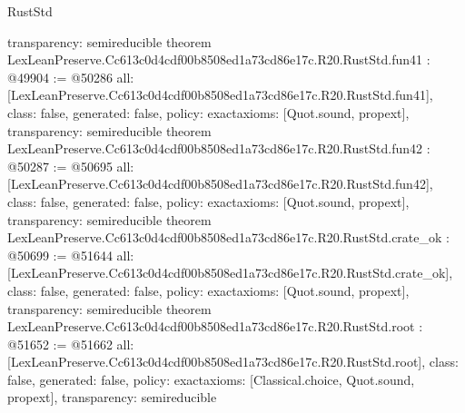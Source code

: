 \begin{lexlean}{RustStd}
\begin{coremodule}
{  transparency: semireducible
}
theorem LexLeanPreserve.Cc613c0d4cdf00b8508ed1a73cd86e17c.R20.RustStd.fun41 : @49904 := @50286 {
  all: [LexLeanPreserve.Cc613c0d4cdf00b8508ed1a73cd86e17c.R20.RustStd.fun41],
  class: false,
  generated: false,
  policy: exact{axioms: [Quot.sound, propext]},
  transparency: semireducible
}
theorem LexLeanPreserve.Cc613c0d4cdf00b8508ed1a73cd86e17c.R20.RustStd.fun42 : @50287 := @50695 {
  all: [LexLeanPreserve.Cc613c0d4cdf00b8508ed1a73cd86e17c.R20.RustStd.fun42],
  class: false,
  generated: false,
  policy: exact{axioms: [Quot.sound, propext]},
  transparency: semireducible
}
theorem LexLeanPreserve.Cc613c0d4cdf00b8508ed1a73cd86e17c.R20.RustStd.crate_ok : @50699 := @51644 {
  all: [LexLeanPreserve.Cc613c0d4cdf00b8508ed1a73cd86e17c.R20.RustStd.crate_ok],
  class: false,
  generated: false,
  policy: exact{axioms: [Quot.sound, propext]},
  transparency: semireducible
}
theorem LexLeanPreserve.Cc613c0d4cdf00b8508ed1a73cd86e17c.R20.RustStd.root : @51652 := @51662 {
  all: [LexLeanPreserve.Cc613c0d4cdf00b8508ed1a73cd86e17c.R20.RustStd.root],
  class: false,
  generated: false,
  policy: exact{axioms: [Classical.choice, Quot.sound, propext]},
  transparency: semireducible
}


\end{coremodule}
\end{lexlean}

